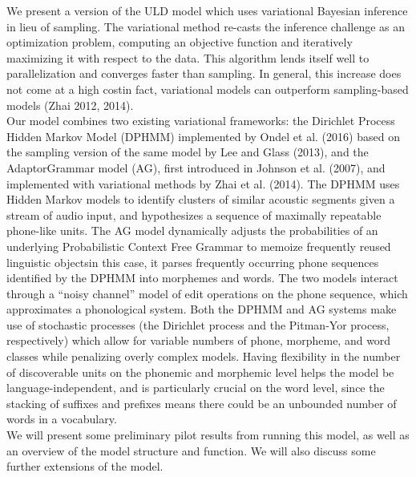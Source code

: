 \documentclass[12pt,letterpaper]{article}
\newcommand\tab[1][1cm]{\hspace*{#1}}
\begin{document}
\tab We present a version of the ULD model which uses variational Bayesian inference in lieu of sampling. The variational method re-casts the inference challenge as an optimization problem, computing an objective function and iteratively maximizing it with respect to the data. This algorithm lends itself well to parallelization and converges faster than sampling. In general, this increase does not come at a high cost\textemdash in fact, variational models can outperform sampling-based models (Zhai 2012, 2014).\\
\tab Our model combines two existing variational frameworks: the Dirichlet Process Hidden Markov Model (DPHMM) implemented by Ondel et al. (2016) based on the sampling version of the same model by Lee and Glass (2013), and the AdaptorGrammar model (AG), first introduced in Johnson et al. (2007), and implemented with variational methods by Zhai et al. (2014). The DPHMM uses Hidden Markov models to identify clusters of similar acoustic segments given a stream of audio input, and hypothesizes a sequence of maximally repeatable phone-like units. The AG model dynamically adjusts the probabilities of an underlying Probabilistic Context Free Grammar to memoize frequently reused linguistic objects\textemdash in this case, it parses frequently occurring phone sequences identified by the DPHMM into morphemes and words. The two models interact through a ``noisy channel'' model of edit operations on the phone sequence, which approximates a phonological system. Both the DPHMM and AG systems make use of stochastic processes (the Dirichlet process and the Pitman-Yor process, respectively) which allow for variable numbers of phone, morpheme, and word classes while penalizing overly complex models. Having flexibility in the number of discoverable units on the phonemic and morphemic level helps the model be language-independent, and is particularly crucial on the word level, since the stacking of suffixes and prefixes means there could be an unbounded number of words in a vocabulary. \\
\tab We will present some preliminary pilot results from running this model, as well as an overview of the model structure and function. We will also discuss some further extensions of the model. 
\end{document}
